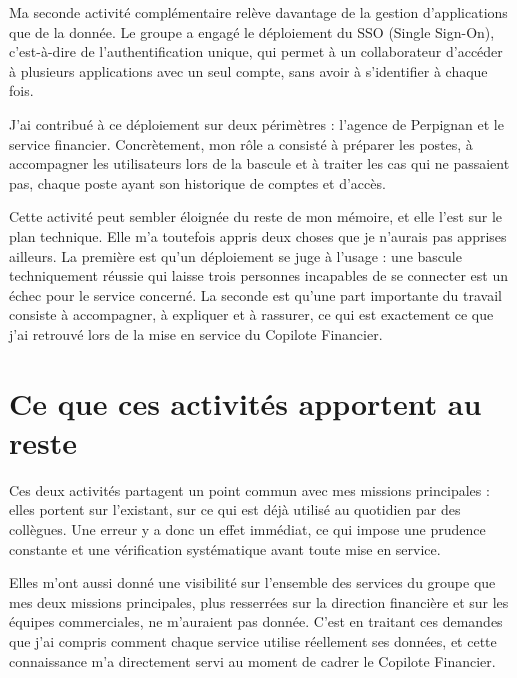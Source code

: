 Ma seconde activité complémentaire relève davantage de la gestion d'applications que de la
donnée. Le groupe a engagé le déploiement du SSO (Single Sign-On), c'est-à-dire de
l'authentification unique, qui permet à un collaborateur d'accéder à plusieurs applications avec
un seul compte, sans avoir à s'identifier à chaque fois.

J'ai contribué à ce déploiement sur deux périmètres : l'agence de Perpignan et le service
financier. Concrètement, mon rôle a consisté à préparer les postes, à accompagner les
utilisateurs lors de la bascule et à traiter les cas qui ne passaient pas, chaque poste ayant
son historique de comptes et d'accès.

Cette activité peut sembler éloignée du reste de mon mémoire, et elle l'est sur le plan
technique. Elle m'a toutefois appris deux choses que je n'aurais pas apprises ailleurs. La
première est qu'un déploiement se juge à l'usage : une bascule techniquement réussie qui laisse
trois personnes incapables de se connecter est un échec pour le service concerné. La seconde est
qu'une part importante du travail consiste à accompagner, à expliquer et à rassurer, ce qui est
exactement ce que j'ai retrouvé lors de la mise en service du Copilote Financier.

\section{Ce que ces activités apportent au reste}

Ces deux activités partagent un point commun avec mes missions principales : elles portent sur
l'existant, sur ce qui est déjà utilisé au quotidien par des collègues. Une erreur y a donc un
effet immédiat, ce qui impose une prudence constante et une vérification systématique avant toute
mise en service.

Elles m'ont aussi donné une visibilité sur l'ensemble des services du groupe que mes deux
missions principales, plus resserrées sur la direction financière et sur les équipes
commerciales, ne m'auraient pas donnée. C'est en traitant ces demandes que j'ai compris comment
chaque service utilise réellement ses données, et cette connaissance m'a directement servi au
moment de cadrer le Copilote Financier.
